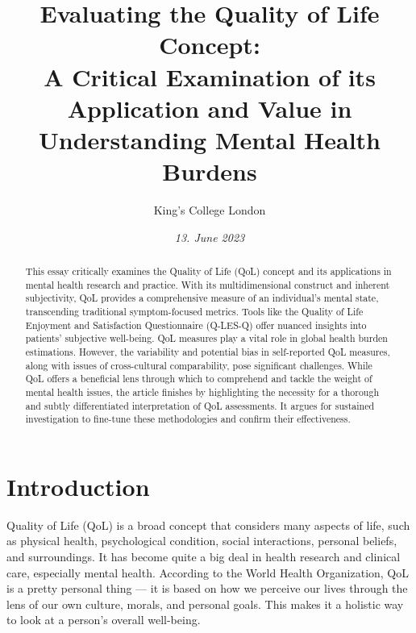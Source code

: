 \documentclass[10pt]{article}
\title{\textbf{Evaluating the Quality of Life Concept:} \\ A Critical Examination of its Application and Value in Understanding Mental Health Burdens}
\author[ ]{King’s College London}
\date{\textit{13. June 2023}}
\begin{document}

\maketitle
\thispagestyle{empty}

\begin{sloppypar} %
  \begin{abstract}
    This essay critically examines the Quality of Life (QoL) concept and its applications in mental health research and practice. With its multidimensional construct and inherent subjectivity, QoL provides a comprehensive measure of an individual's mental state, transcending traditional symptom-focused metrics. Tools like the Quality of Life Enjoyment and Satisfaction Questionnaire (Q-LES-Q) offer nuanced insights into patients' subjective well-being. QoL measures play a vital role in global health burden estimations. However, the variability and potential bias in self-reported QoL measures, along with issues of cross-cultural comparability, pose significant challenges. While QoL offers a beneficial lens through which to comprehend and tackle the weight of mental health issues, the article finishes by highlighting the necessity for a thorough and subtly differentiated interpretation of QoL assessments. It argues for sustained investigation to fine-tune these methodologies and confirm their effectiveness.
  \end{abstract}
  \pagebreak

  \tableofcontents
  \pagebreak

  \listoffigures
  \pagebreak

  \listoftables
  \pagebreak


  \doublespacing

  \section{Introduction} \label{sec:introduction}
  Quality of Life (QoL) is a broad concept that considers many aspects of life, such as physical health, psychological condition, social interactions, personal beliefs, and surroundings. It has become quite a big deal in health research and clinical care, especially mental health. According to the World Health Organization, QoL is a pretty personal thing — it is based on how we perceive our lives through the lens of our own culture, morals, and personal goals. This makes it a holistic way to look at a person's overall well-being.


\end{sloppypar}
\end{document}
